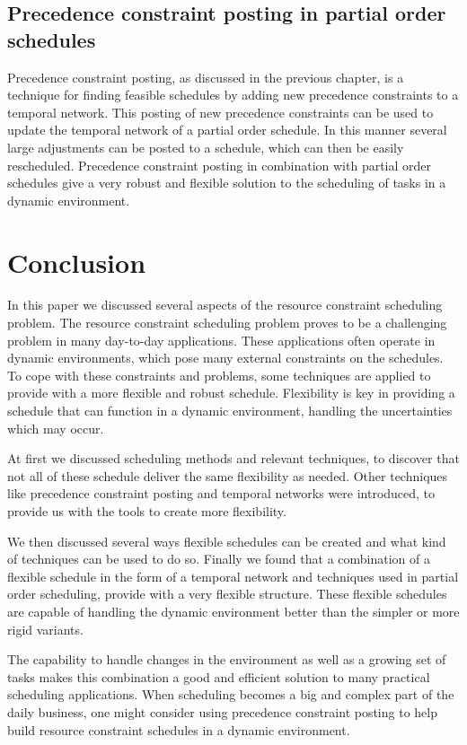 \documentclass{article}
\begin{document}
\subsection{Precedence constraint posting in partial order schedules}
Precedence constraint posting, as discussed in the previous chapter, is a technique for finding feasible schedules by adding new precedence constraints to a temporal network.
This posting of new precedence constraints can be used to update the temporal network of a partial order schedule.
In this manner several large adjustments can be posted to a schedule, which can then be easily rescheduled.
Precedence constraint posting in combination with partial order schedules give a very robust and flexible solution to the scheduling of tasks in a dynamic environment.

\newpage

\section{Conclusion}
In this paper we discussed several aspects of the resource constraint scheduling problem.
The resource constraint scheduling problem proves to be a challenging problem in many day-to-day applications.
These applications often operate in dynamic environments, which pose many external constraints on the schedules.
To cope with these constraints and problems, some techniques are applied to provide with a more flexible and robust schedule.
Flexibility is key in providing a schedule that can function in a dynamic environment, handling the uncertainties which may occur.

At first we discussed scheduling methods and relevant techniques, to discover that not all of these schedule deliver the same flexibility as needed.
Other techniques like precedence constraint posting and temporal networks were introduced, to provide us with the tools to create more flexibility.

We then discussed several ways flexible schedules can be created and what kind of techniques can be used to do so.
Finally we found that a combination of a flexible schedule in the form of a temporal network and techniques used in partial order scheduling, provide with a very flexible structure.
These flexible schedules are capable of handling the dynamic environment better than the simpler or more rigid variants.

The capability to handle changes in the environment as well as a growing set of tasks makes this combination a good and efficient solution to many practical scheduling applications.
When scheduling becomes a big and complex part of the daily business, one might consider using precedence constraint posting to help build resource constraint schedules in a dynamic environment.


\newpage


\end{document}
